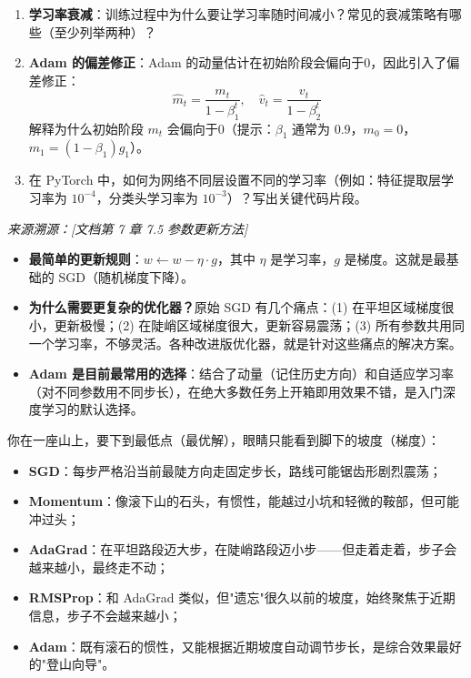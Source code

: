 \documentclass[a4paper,11pt]{ctexart}
\begin{document}
\begin{problembox}
\begin{enumerate}[(1)]
        \item \textbf{学习率衰减}：训练过程中为什么要让学习率随时间减小？常见的衰减策略有哪些（至少列举两种）？

        \item \textbf{Adam 的偏差修正}：Adam 的动量估计在初始阶段会偏向于0，因此引入了偏差修正：
        \[
        \hat{m}_t = \frac{m_t}{1 - \beta_1^t}, \quad \hat{v}_t = \frac{v_t}{1 - \beta_2^t}
        \]
        解释为什么初始阶段 $m_t$ 会偏向于0（提示：$\beta_1$ 通常为 0.9，$m_0=0$，$m_1 = (1-\beta_1) g_1$）。

        \item 在 PyTorch 中，如何为网络不同层设置不同的学习率（例如：特征提取层学习率为 $10^{-4}$，分类头学习率为 $10^{-3}$）？写出关键代码片段。
    \end{enumerate}

    \vspace{0.2cm}
    {\color{gray}\small\textit{来源溯源：[文档第 7 章 7.5 参数更新方法]}}
\end{problembox}

\begin{beginnerbox}
    \begin{itemize}
        \item \textbf{最简单的更新规则}：$w \leftarrow w - \eta \cdot g$，其中 $\eta$ 是学习率，$g$ 是梯度。这就是最基础的 SGD（随机梯度下降）。
        \item \textbf{为什么需要更复杂的优化器？}原始 SGD 有几个痛点：(1) 在平坦区域梯度很小，更新极慢；(2) 在陡峭区域梯度很大，更新容易震荡；(3) 所有参数共用同一个学习率，不够灵活。各种改进版优化器，就是针对这些痛点的解决方案。
        \item \textbf{Adam 是目前最常用的选择}：结合了动量（记住历史方向）和自适应学习率（对不同参数用不同步长），在绝大多数任务上开箱即用效果不错，是入门深度学习的默认选择。
    \end{itemize}
\end{beginnerbox}

\begin{metaphorbox}
    你在一座山上，要下到最低点（最优解），眼睛只能看到脚下的坡度（梯度）：

    \begin{itemize}
        \item \textbf{SGD}：每步严格沿当前最陡方向走固定步长，路线可能锯齿形剧烈震荡；
        \item \textbf{Momentum}：像滚下山的石头，有惯性，能越过小坑和轻微的鞍部，但可能冲过头；
        \item \textbf{AdaGrad}：在平坦路段迈大步，在陡峭路段迈小步——但走着走着，步子会越来越小，最终走不动；
        \item \textbf{RMSProp}：和 AdaGrad 类似，但"遗忘"很久以前的坡度，始终聚焦于近期信息，步子不会越来越小；
        \item \textbf{Adam}：既有滚石的惯性，又能根据近期坡度自动调节步长，是综合效果最好的"登山向导"。
    \end{itemize}
\end{metaphorbox}
\end{document}
